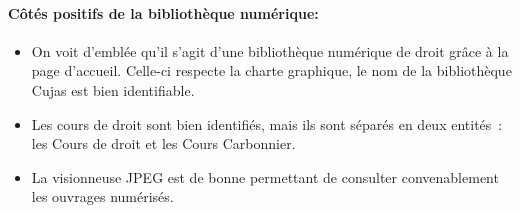 \paragraph*{Côtés positifs de la bibliothèque numérique:}
\begin{itemize}
	\item On voit d’emblée qu’il s’agit d’une bibliothèque numérique de droit grâce à la page d’accueil. Celle-ci respecte la charte graphique, le nom de la bibliothèque Cujas est bien identifiable. 
\item Les cours de droit sont bien identifiés, mais ils sont séparés en deux entités : les Cours de droit et les Cours Carbonnier. 
\item La visionneuse JPEG est de bonne permettant de consulter convenablement les ouvrages numérisés.
\end{itemize}
